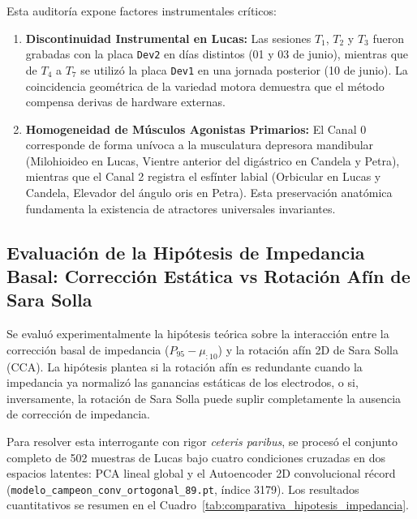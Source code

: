 \documentclass[11pt,a4paper]{article}
\begin{document}
Esta auditoría expone factores instrumentales críticos:
\begin{enumerate}
    \item \textbf{Discontinuidad Instrumental en Lucas:} Las sesiones $T_1$, $T_2$ y $T_3$ fueron grabadas con la placa \texttt{Dev2} en días distintos (01 y 03 de junio), mientras que de $T_4$ a $T_7$ se utilizó la placa \texttt{Dev1} en una jornada posterior (10 de junio). La coincidencia geométrica de la variedad motora demuestra que el método compensa derivas de hardware externas.
    \item \textbf{Homogeneidad de Músculos Agonistas Primarios:} El Canal 0 corresponde de forma unívoca a la musculatura depresora mandibular (Milohioideo en Lucas, Vientre anterior del digástrico en Candela y Petra), mientras que el Canal 2 registra el esfínter labial (Orbicular en Lucas y Candela, Elevador del ángulo oris en Petra). Esta preservación anatómica fundamenta la existencia de atractores universales invariantes.
\end{enumerate}

\subsection{Evaluación de la Hipótesis de Impedancia Basal: Corrección Estática vs Rotación Afín de Sara Solla}
\label{subsec:evaluacion_hipotesis_impedancia}

Se evaluó experimentalmente la hipótesis teórica sobre la interacción entre la corrección basal de impedancia ($P_{95} - \mu_{:10}$) y la rotación afín 2D de Sara Solla (CCA). La hipótesis plantea si la rotación afín es redundante cuando la impedancia ya normalizó las ganancias estáticas de los electrodos, o si, inversamente, la rotación de Sara Solla puede suplir completamente la ausencia de corrección de impedancia.

Para resolver esta interrogante con rigor \textit{ceteris paribus}, se procesó el conjunto completo de 502 muestras de Lucas bajo cuatro condiciones cruzadas en dos espacios latentes: PCA lineal global y el Autoencoder 2D convolucional récord (\texttt{modelo\_campeon\_conv\_ortogonal\_89.pt}, índice 3179). Los resultados cuantitativos se resumen en el Cuadro~\ref{tab:comparativa_hipotesis_impedancia}.
\end{document}
